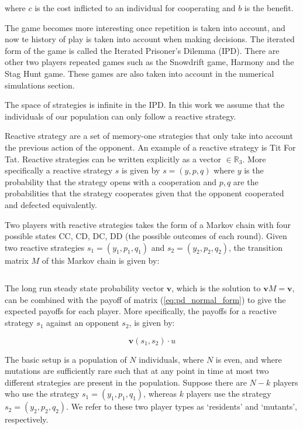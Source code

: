 \documentclass[11pt]{article}
\newcommand{\R}{\mathbb{R}}
\theoremstyle{plainCl1}
\theoremstyle{plainCl2}
\begin{document}
where \(c\) is the cost inflicted to an individual for cooperating and \(b\) is
the benefit.

The game becomes more interesting once repetition is taken into account, and
now te history of play is taken into account when making decisions. The iterated
form of the game is called the Iterated Prisoner's Dilemma (IPD). There are other
two players repeated games such as the Snowdrift game, Harmony and the Stag Hunt
game. These games are also taken into account in the numerical simulations section.

The space of strategies is infinite in the IPD. In this work we assume that
the individuals of our population can only follow a reactive strategy.

Reactive strategy are a set of memory-one strategies that only take into account
the previous action of the opponent. An example of a reactive strategy is Tit
For Tat. Reactive strategies can be written explicitly as a vector \(\in
\R_{3}\). More specifically a reactive strategy \(s\) is given by \(s=(y, p,
q)\) where \(y\) is the probability that the strategy opens with a cooperation
and \(p, q\) are the probabilities that the strategy cooperates given that the
opponent cooperated and defected equivalently.

Two players with reactive strategies takes the form of a Markov chain
with four possible states CC, CD, DC, DD (the possible outcomes of each round).
Given two reactive strategies \(s_{1}=(y_{1}, p_{1}, q_{1})\) and 
\(s_{2}=(y_{2}, p_{2}, q_{2})\), the transition matrix \(M\) of this Markov chain
is given by:

\begin{equation}
    
\end{equation}

The long run steady state probability
vector \(\mathbf{v}\), which is the solution to \(\mathbf{v} M = \mathbf{v}\), can be
combined with the payoff of matrix (\ref{eq:pd_normal_form}) to give the expected
payoffs for each player. More specifically, the payoffs for a reactive
strategy \(s_1\) against an opponent \(s_2\), is given by:

\begin{equation}
    \mathbf{v}(s_1, s_2) \cdot u
\end{equation}

The basic setup is a population of \(N\)
individuals, where \(N\) is even, and where mutations are sufficiently rare such
that at any point in time at most two different strategies are present in the
population. Suppose there are \(N - k\) players who use the strategy \(s_{1}=(y_{1},
p_{1}, q_{1})\), whereas \(k\) players use the strategy \(s_{2}=(y_{2}, p_{2},
q_{2})\). We refer to these two player types as ‘residents’ and ‘mutants’,
respectively.
\end{document}

